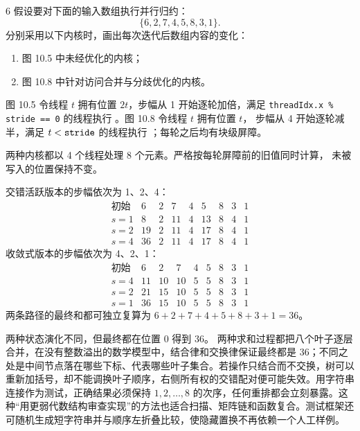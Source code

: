 \begin{solutionexercise}{6}
\problemheading 假设要对下面的输入数组执行并行归约：
\[
  \{6,2,7,4,5,8,3,1\}.
\]
分别采用以下内核时，画出每次迭代后数组内容的变化：
\begin{enumerate}[label=\alph*.,leftmargin=2.2em]
  \item 图 10.5 中未经优化的内核；
  \item 图 10.8 中针对访问合并与分歧优化的内核。
\end{enumerate}
图 10.5 令线程 $t$ 拥有位置 $2t$，步幅从 1 开始逐轮加倍，满足
\texttt{threadIdx.x \% stride == 0} 的线程执行
。图 10.8 令线程 $t$ 拥有位置 $t$，
步幅从 4 开始逐轮减半，满足 $t<\code{stride}$ 的线程执行
；每轮之后均有块级屏障。

\approachheading 两种内核都以 4 个线程处理 8 个元素。严格按每轮屏障前的旧值同时计算，
未被写入的位置保持不变。

\answerheading 交错活跃版本的步幅依次为 1、2、4：
\[
\begin{array}{c|rrrrrrrr}
\text{初始}&6&2&7&4&5&8&3&1\\
s=1&8&2&11&4&13&8&4&1\\
s=2&19&2&11&4&17&8&4&1\\
s=4&36&2&11&4&17&8&4&1
\end{array}
\]
收敛式版本的步幅依次为 4、2、1：
\[
\begin{array}{c|rrrrrrrr}
\text{初始}&6&2&7&4&5&8&3&1\\
s=4&11&10&10&5&5&8&3&1\\
s=2&21&15&10&5&5&8&3&1\\
s=1&36&15&10&5&5&8&3&1
\end{array}
\]
两条路径的最终和都可独立复算为 $6+2+7+4+5+8+3+1=36$。

\conclusionheading 两种状态演化不同，但最终都在位置 0 得到 $\boxed{36}$。
\discussionheading
{}两种求和过程都把八个叶子逐层合并，在没有整数溢出的数学模型中，结合律和交换律保证最终都是 36；不同之处是中间节点落在哪些下标、代表哪些叶子集合。若操作只结合而不交换，树可以重新加括号，却不能调换叶子顺序，右侧所有权的交错配对便可能失效。用字符串连接作为测试，正确结果必须保持 $1,2,\ldots,8$ 的次序，任何重排都会立刻暴露。这种“用更弱代数结构审查实现”的方法也适合扫描、矩阵链和函数复合。测试框架还可随机生成短字符串并与顺序左折叠比较，使隐藏置换不再依赖一个人工样例。


\end{solutionexercise}
